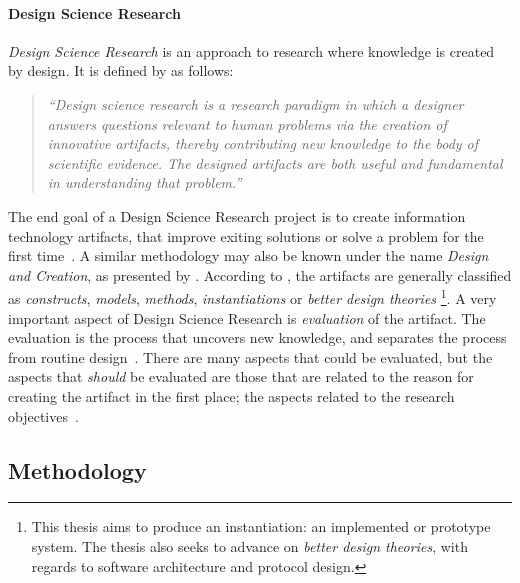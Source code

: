 \paragraph{Design Science Research}
\textit{Design Science Research} is an approach to research where knowledge is created by design.
It is defined by \textcite[p.~5]{alanhevnerDesignResearchInformation2010} as follows:

\begin{quote}
  \textit{``Design science research is a research paradigm in which a designer answers questions relevant to human problems via the creation of innovative artifacts, thereby contributing new knowledge to the body of scientific evidence.
  The designed artifacts are both useful and fundamental in understanding that problem.''}
\end{quote}

The end goal of a Design Science Research project is to create information technology \glspl{artifact}, that improve exiting solutions or solve a problem for the first time~\cite[p.~6]{alanhevnerDesignResearchInformation2010}.
A similar methodology may also be known under the name \textit{Design and Creation}, as presented by \textcite[p.~108]{oatesResearchingInformationSystems2006}.
According to \textcite{alanhevnerDesignResearchInformation2010}, the artifacts are generally classified as \textit{constructs}, \textit{models}, \textit{methods}, \textit{instantiations} or \textit{better design theories}%
\footnote{This thesis aims to produce an instantiation: an implemented or prototype system. The thesis also seeks to advance on \textit{better design theories}, with regards to software architecture and protocol design.}.
A very important aspect of Design Science Research is \textit{evaluation} of the artifact.
The evaluation is the process that uncovers new knowledge, and separates the process from routine design~\cite[p.~7]{alanhevnerDesignResearchInformation2010}.
There are many aspects that could be evaluated, but the aspects that \textit{should} be evaluated are those that are related to the reason for creating the artifact in the first place; the aspects related to the research objectives~\cite[p.~115]{oatesResearchingInformationSystems2006}.


\subsection{Methodology}


